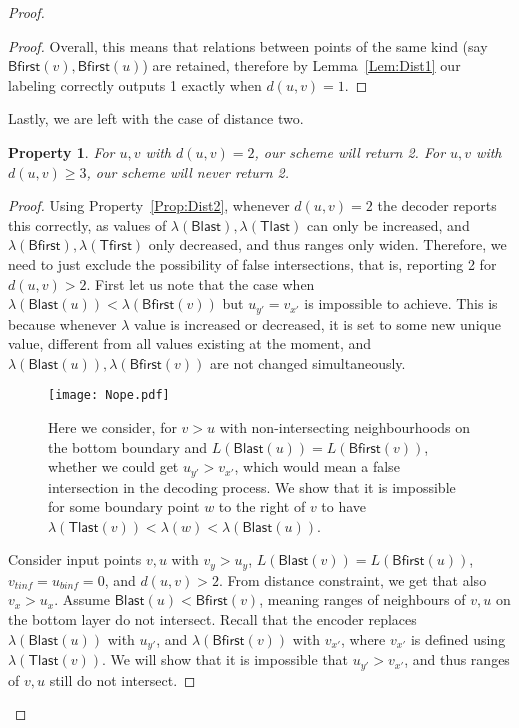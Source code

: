 \documentclass[a4paper,11pt]{article}
\newcommand{\lam}{\lambda}
\newcommand{\Blast}{\mathsf{Blast}}
\newcommand{\Bfirst}{\mathsf{Bfirst}}
\newcommand{\Tlast}{\mathsf{Tlast}}
\newcommand{\Tfirst}{\mathsf{Tfirst}}
\newtheorem{property}[theorem]{Property}
\begin{document}
\begin{proof}
\begin{proof}
Overall, this means that relations between points of the same kind (say $\Bfirst(v),\Bfirst(u)$) are retained,
therefore by Lemma~\ref{Lem:Dist1} our labeling correctly outputs 1 exactly when $d(u,v) = 1$.
\end{proof}

Lastly, we are left with the case of distance two.

\begin{property}
For $u,v$ with $d(u,v)=2$, our scheme will return 2.
For $u,v$ with $d(u,v) \geq 3$, our scheme will never return 2.
\label{Prop:Dec2}
\end{property}
\begin{proof}

Using Property~\ref{Prop:Dist2}, whenever $d(u,v)=2$ the decoder reports this correctly, as values of $\lam(\Blast),
\lam(\Tlast)$ can only be increased, and $\lam(\Bfirst),\lam(\Tfirst)$ only decreased, and thus ranges only widen.
Therefore, we need to just exclude the possibility of false intersections, that is, reporting 2 for $d(u,v) > 2$.
First let us note that the case when $\lam(\Blast(u))<\lam(\Bfirst(v))$ but $u_{y'}=v_{x'}$ is impossible to achieve.
This is because whenever $\lam$ value is increased or decreased, it is set to some new unique value, different from all
values existing at the moment, and $\lam(\Blast(u)),\lam(\Bfirst(v))$ are not changed simultaneously.

\begin{figure}[h]
\begin{center}
  \texttt{[image: Nope.pdf]}
\end{center}
\caption{Here we consider, for $v>u$ with non-intersecting neighbourhoods on the bottom boundary
and $L(\Blast(u))=L(\Bfirst(v))$, whether we could get $u_{y'}>v_{x'}$,
which would mean a false intersection in the decoding process.
We show that it is impossible for some boundary point $w$ to the right of $v$ to have $\lam(\Tlast(v))<\lam(w)<\lam(\Blast(u))$.}
\label{Fig:Nope}
\end{figure}

Consider input points $v,u$ with $v_y > u_y$, $L(\Blast(v))=L(\Bfirst(u))$, $v_{tinf}=u_{binf}=0$, and $d(u,v)>2$.
From distance constraint, we get that also $v_x > u_x$.
Assume $\Blast(u)<\Bfirst(v)$, meaning ranges of neighbours of $v,u$ on the bottom layer do not intersect. 
Recall that the encoder replaces $\lam(\Blast(u))$ with $u_{y'}$, and $\lam(\Bfirst(v))$ with $v_{x'}$,
where $v_{x'}$ is defined using $\lam(\Tlast(v))$.
We will show that it is impossible that $u_{y'}>v_{x'}$, and thus ranges of $v,u$ still do not intersect.


\end{proof}
\end{proof}
\end{document}
